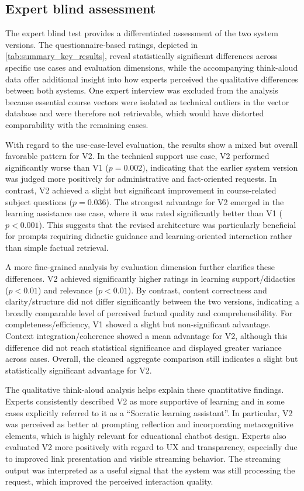\subsection{Expert blind assessment}

The expert blind test provides a differentiated assessment of the two system versions. The questionnaire-based ratings, depicted in \autoref{tab:summary_key_results}, reveal statistically significant differences across specific use cases and evaluation dimensions, while the accompanying think-aloud data offer additional insight into how experts perceived the qualitative differences between both systems. One expert interview was excluded from the analysis because essential course vectors were isolated as technical outliers in the vector database and were therefore not retrievable, which would have distorted comparability with the remaining cases.

With regard to the use-case-level evaluation, the results show a mixed but overall favorable pattern for V2. In the technical support use case, V2 performed significantly worse than V1 ($p = 0.002$), indicating that the earlier system version was judged more positively for administrative and fact-oriented requests. In contrast, V2 achieved a slight but significant improvement in course-related subject questions ($p = 0.036$). The strongest advantage for V2 emerged in the learning assistance use case, where it was rated significantly better than V1 ($p < 0.001$). This suggests that the revised architecture was particularly beneficial for prompts requiring didactic guidance and learning-oriented interaction rather than simple factual retrieval.

A more fine-grained analysis by evaluation dimension further clarifies these differences. V2 achieved significantly higher ratings in learning support/didactics ($p < 0.01$) and relevance ($p < 0.01$). By contrast, content correctness and clarity/structure did not differ significantly between the two versions, indicating a broadly comparable level of perceived factual quality and comprehensibility. For completeness/efficiency, V1 showed a slight but non-significant advantage. Context integration/coherence showed a mean advantage for V2, although this difference did not reach statistical significance and displayed greater variance across cases. Overall, the cleaned aggregate comparison still indicates a slight but statistically significant advantage for V2.

The qualitative think-aloud analysis helps explain these quantitative findings. Experts consistently described V2 as more supportive of learning and in some cases explicitly referred to it as a \enquote{Socratic learning assistant}. In particular, V2 was perceived as better at prompting reflection and incorporating metacognitive elements, which is highly relevant for educational chatbot design. Experts also evaluated V2 more positively with regard to UX and transparency, especially due to improved link presentation and visible streaming behavior. The streaming output was interpreted as a useful signal that the system was still processing the request, which improved the perceived interaction quality.

